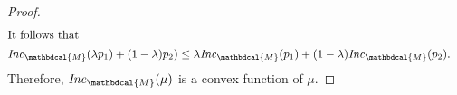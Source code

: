 \documentclass[letterpaper]{article} %
\theoremstyle{plain}
\theoremstyle{definition}
\theoremstyle{remark}
\newcommand{\dg}[1]{\mathbdcal{#1}}
\newcommand\Inc{\mathit{Inc}}
\begin{document}
\begin{proof}
\begin{align*}
    \shortintertext{It follows that} 
		\Inc_{\dg M}( \lambda p_1) + (1-\lambda)p_2)
					&\leq \lambda \Inc_{\dg M}(p_1) + (1-\lambda)
					\Inc_{\dg M}(p_2). 
	\end{align*}
	Therefore, $\Inc_{\dg M}( \mu)$ is a convex function of $\mu$.
\end{proof}
\end{document}
